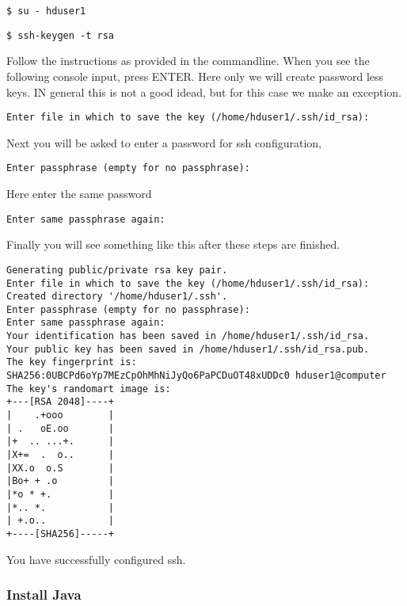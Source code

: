 \begin{lstlisting}
$ su - hduser1
\end{lstlisting}

\begin{lstlisting}
$ ssh-keygen -t rsa
\end{lstlisting}

Follow the instructions as provided in the commandline.
When you see the following console input, press ENTER. Here only we
will create password less keys. IN general this is not a good idead,
but for this case we make an exception.

\begin{lstlisting}
Enter file in which to save the key (/home/hduser1/.ssh/id_rsa):
\end{lstlisting}

Next you will be asked to enter a password for ssh configuration,

\begin{lstlisting}
Enter passphrase (empty for no passphrase):
\end{lstlisting}

Here enter the same password

\begin{lstlisting}
Enter same passphrase again:
\end{lstlisting}

Finally you will see something like this after these steps are finished.

\begin{lstlisting}
Generating public/private rsa key pair.
Enter file in which to save the key (/home/hduser1/.ssh/id_rsa):
Created directory '/home/hduser1/.ssh'.
Enter passphrase (empty for no passphrase):
Enter same passphrase again:
Your identification has been saved in /home/hduser1/.ssh/id_rsa.
Your public key has been saved in /home/hduser1/.ssh/id_rsa.pub.
The key fingerprint is:
SHA256:0UBCPd6oYp7MEzCpOhMhNiJyQo6PaPCDuOT48xUDDc0 hduser1@computer
The key's randomart image is:
+---[RSA 2048]----+
|    .+ooo        |
| .   oE.oo       |
|+  .. ...+.      |
|X+=  .  o..      |
|XX.o  o.S        |
|Bo+ + .o         |
|*o * +.          |
|*.. *.           |
| +.o..           |
+----[SHA256]-----+
\end{lstlisting}

You have successfully configured ssh.

\subsubsection{Install Java}

